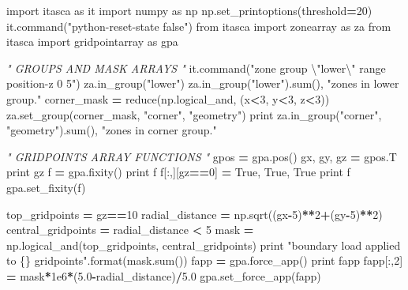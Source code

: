 \documentclass[a4paper, nobind]{templates/ociamthesis}
\newenvironment{Shaded}{\begin{snugshade}}{\end{snugshade}}
\newcommand{\BuiltInTok}[1]{#1}
\newcommand{\CharTok}[1]{\textcolor[rgb]{0.31,0.60,0.02}{#1}}
\newcommand{\CommentTok}[1]{\textcolor[rgb]{0.56,0.35,0.01}{\textit{#1}}}
\newcommand{\DecValTok}[1]{\textcolor[rgb]{0.00,0.00,0.81}{#1}}
\newcommand{\FloatTok}[1]{\textcolor[rgb]{0.00,0.00,0.81}{#1}}
\newcommand{\ImportTok}[1]{#1}
\newcommand{\NormalTok}[1]{#1}
\newcommand{\OperatorTok}[1]{\textcolor[rgb]{0.81,0.36,0.00}{\textbf{#1}}}
\newcommand{\SpecialCharTok}[1]{\textcolor[rgb]{0.00,0.00,0.00}{#1}}
\newcommand{\StringTok}[1]{\textcolor[rgb]{0.31,0.60,0.02}{#1}}
\newcommand{\VariableTok}[1]{\textcolor[rgb]{0.00,0.00,0.00}{#1}}
\renewenvironment{Shaded}
{
  \vspace{10pt}%
  \begin{snugshade}%
}{%
  \end{snugshade}%
  \vspace{8pt}%
}
\begin{document}
\begin{Shaded}
\begin{Highlighting}[]
\ImportTok{import}\NormalTok{ itasca }\ImportTok{as}\NormalTok{ it}
\ImportTok{import}\NormalTok{ numpy }\ImportTok{as}\NormalTok{ np}
\NormalTok{np.set\_printoptions(threshold}\OperatorTok{=}\DecValTok{20}\NormalTok{)}
\NormalTok{it.command(}\StringTok{"python{-}reset{-}state false"}\NormalTok{)}
\ImportTok{from}\NormalTok{ itasca }\ImportTok{import}\NormalTok{ zonearray }\ImportTok{as}\NormalTok{ za}
\ImportTok{from}\NormalTok{ itasca }\ImportTok{import}\NormalTok{ gridpointarray }\ImportTok{as}\NormalTok{ gpa}

\CommentTok{" GROUPS AND MASK ARRAYS "}
\NormalTok{it.command(}\StringTok{"zone group }\CharTok{\textbackslash{}"}\StringTok{lower}\CharTok{\textbackslash{}"}\StringTok{ range position{-}z 0 5"}\NormalTok{)}
\NormalTok{za.in\_group(}\StringTok{"lower"}\NormalTok{)}
\NormalTok{za.in\_group(}\StringTok{"lower"}\NormalTok{).}\BuiltInTok{sum}\NormalTok{(), }\StringTok{"zones in lower group."}
\NormalTok{corner\_mask }\OperatorTok{=} \BuiltInTok{reduce}\NormalTok{(np.logical\_and, (x}\OperatorTok{\textless{}}\DecValTok{3}\NormalTok{, y}\OperatorTok{\textless{}}\DecValTok{3}\NormalTok{, z}\OperatorTok{\textless{}}\DecValTok{3}\NormalTok{))}
\NormalTok{za.set\_group(corner\_mask, }\StringTok{"corner"}\NormalTok{, }\StringTok{"geometry"}\NormalTok{)}
\BuiltInTok{print}\NormalTok{ za.in\_group(}\StringTok{"corner"}\NormalTok{, }\StringTok{"geometry"}\NormalTok{).}\BuiltInTok{sum}\NormalTok{(), }\StringTok{"zones in corner group."}

\CommentTok{" GRIDPOINTS ARRAY FUNCTIONS "}
\NormalTok{gpos }\OperatorTok{=}\NormalTok{ gpa.pos()}
\NormalTok{gx, gy, gz }\OperatorTok{=}\NormalTok{ gpos.T}
\BuiltInTok{print}\NormalTok{ gz}
\NormalTok{f }\OperatorTok{=}\NormalTok{ gpa.fixity()}
\BuiltInTok{print}\NormalTok{ f}
\NormalTok{f[:,][gz}\OperatorTok{==}\DecValTok{0}\NormalTok{] }\OperatorTok{=} \VariableTok{True}\NormalTok{, }\VariableTok{True}\NormalTok{, }\VariableTok{True}
\BuiltInTok{print}\NormalTok{ f}
\NormalTok{gpa.set\_fixity(f)}

\NormalTok{top\_gridpoints }\OperatorTok{=}\NormalTok{ gz}\OperatorTok{==}\DecValTok{10}
\NormalTok{radial\_distance }\OperatorTok{=}\NormalTok{ np.sqrt((gx}\OperatorTok{{-}}\DecValTok{5}\NormalTok{)}\OperatorTok{**}\DecValTok{2}\OperatorTok{+}\NormalTok{(gy}\OperatorTok{{-}}\DecValTok{5}\NormalTok{)}\OperatorTok{**}\DecValTok{2}\NormalTok{)}
\NormalTok{central\_gridpoints }\OperatorTok{=}\NormalTok{ radial\_distance }\OperatorTok{\textless{}} \DecValTok{5}
\NormalTok{mask }\OperatorTok{=}\NormalTok{ np.logical\_and(top\_gridpoints, central\_gridpoints)}
\BuiltInTok{print} \StringTok{"boundary load applied to }\SpecialCharTok{\{\}}\StringTok{ gridpoints"}\NormalTok{.}\BuiltInTok{format}\NormalTok{(mask.}\BuiltInTok{sum}\NormalTok{())}
\NormalTok{fapp }\OperatorTok{=}\NormalTok{ gpa.force\_app()}
\BuiltInTok{print}\NormalTok{ fapp}
\NormalTok{fapp[:,}\DecValTok{2}\NormalTok{] }\OperatorTok{=}\NormalTok{ mask}\OperatorTok{*}\FloatTok{1e6}\OperatorTok{*}\NormalTok{(}\FloatTok{5.0}\OperatorTok{{-}}\NormalTok{radial\_distance)}\OperatorTok{/}\FloatTok{5.0}
\NormalTok{gpa.set\_force\_app(fapp)}


\end{Highlighting}
\end{Shaded}
\end{document}
